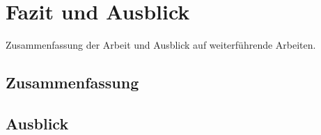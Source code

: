 \chapter{Fazit und Ausblick}
\label{sec:fazit}

Zusammenfassung der Arbeit und Ausblick auf weiterführende Arbeiten.

\section{Zusammenfassung}

\section{Ausblick}
